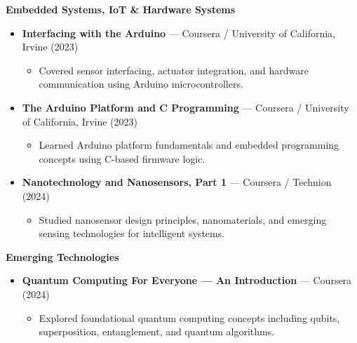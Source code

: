 \documentclass[a4paper,11pt]{article}
\begin{document}
\textbf{Embedded Systems, IoT \& Hardware Systems}
\begin{itemize}

    \item \textbf{Interfacing with the Arduino} --- Coursera / University of California, Irvine (2023)

    \begin{itemize}
        \item Covered sensor interfacing, actuator integration, and hardware communication using Arduino microcontrollers.
    \end{itemize}

    \item \textbf{The Arduino Platform and C Programming} --- Coursera / University of California, Irvine (2023)

    \begin{itemize}
        \item Learned Arduino platform fundamentals and embedded programming concepts using C-based firmware logic.
    \end{itemize}

    \item \textbf{Nanotechnology and Nanosensors, Part 1} --- Coursera / Technion (2024)

    \begin{itemize}
        \item Studied nanosensor design principles, nanomaterials, and emerging sensing technologies for intelligent systems.
    \end{itemize}

\end{itemize}

\vspace{3pt}

\textbf{Emerging Technologies}
\begin{itemize}

    \item \textbf{Quantum Computing For Everyone --- An Introduction} --- Coursera (2024)

    \begin{itemize}
        \item Explored foundational quantum computing concepts including qubits, superposition, entanglement, and quantum algorithms.
    \end{itemize}

\end{itemize}

\vspace{3pt}
\end{document}

